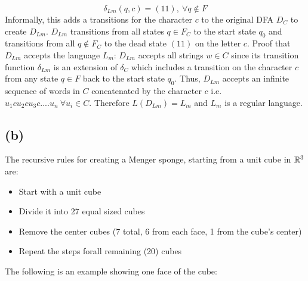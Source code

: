 \documentclass[12pt]{article}
\begin{document}
$$\delta_{Lm}(q, c) = (11) ,\: \forall q \notin F$$
Informally, this adds a transitions for the character $c$ to the original DFA
$D_C$ to create $D_{Lm}$. $D_{Lm}$ transitions from all states $q \in F_C$ to
the start state $q_0$ and transitions from all $q \notin F_C$ to the dead state
$(11)$ on the letter $c$.
\newline
\newline
Proof that $D_{Lm}$ accepts the language $L_m$:
\newline
\indent $D_{Lm}$ accepts all strings $w \in C$ since its transition function
$\delta_{Lm}$ is an extension of $\delta_C$ which includes a transition on the
character $c$ from any state $q \in F$ back to the start state $q_0$. Thus,
$D_{Lm}$ accepts an infinite sequence of words in $C$ concatenated by the
character $c$ i.e. $u_1cu_2cu_3c....u_n \: \forall u_i \in C$.
Therefore $L(D_{Lm}) = L_m$ and $L_m$ is a regular language.
\subsection*{(b)} The recursive rules for creating a Menger sponge, starting
from a unit cube in $\mathbb{R}^3$ are:
\begin{itemize}
\item Start with a unit cube
\item Divide it into 27 equal sized cubes
\item Remove the center cubes
(7 total, 6 from each face, 1 from the cube's center)
\item Repeat the steps forall remaining (20) cubes
\end{itemize}
The following is an example showing one face of the cube:
\newline
{}
\newline
{}
\end{document}
